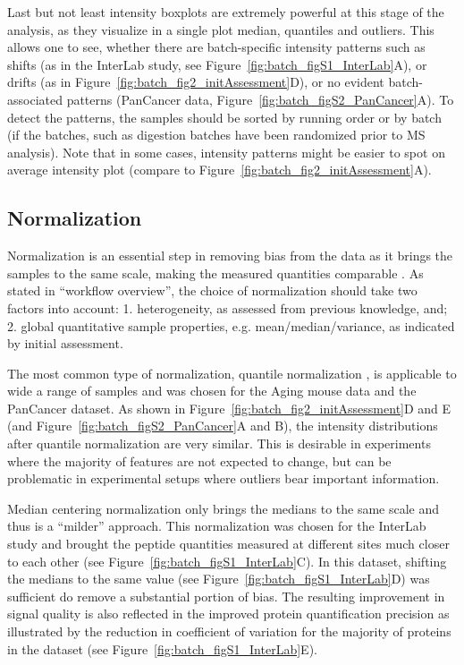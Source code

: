 \documentclass[num-refs]{wiley-article}
\begin{document}
Last but not least intensity boxplots are extremely powerful at this stage of the analysis, as they visualize in a single plot median, quantiles and outliers. This allows one to see, whether there are batch-specific intensity patterns such as shifts (as in the InterLab study, see Figure~\ref{fig:batch_figS1_InterLab}A), or drifts (as in Figure~\ref{fig:batch_fig2_initAssessment}D), or no evident batch-associated patterns (PanCancer data, Figure~\ref{fig:batch_figS2_PanCancer}A). To detect the patterns, the samples should be sorted by running order or by batch (if the batches, such as digestion batches have been randomized prior to MS analysis). Note that in some cases, intensity patterns might be easier to spot on average intensity plot (compare to Figure~\ref{fig:batch_fig2_initAssessment}A).

\subsection{Normalization}

Normalization is an essential step in removing bias from the data as it brings the samples to the same scale, making the measured quantities comparable \cite{Leek:2010aa}. As stated in “workflow overview”, the choice of normalization should take two factors into account: 1. heterogeneity, as assessed from previous knowledge, and; 2. global quantitative sample properties, e.g. mean/median/variance, as indicated by initial assessment.

The most common type of normalization, quantile normalization \cite{Bolstad2003}, is applicable to wide a range of samples and was chosen for the Aging mouse data and the PanCancer dataset. As shown in Figure~\ref{fig:batch_fig2_initAssessment}D and E (and Figure~\ref{fig:batch_figS2_PanCancer}A and B), the intensity distributions after quantile normalization are very similar.  This is desirable in experiments where the majority of features are not expected to change, but can be problematic in experimental setups where outliers bear important information.

Median centering normalization only brings the medians to the same scale and thus is a “milder” approach. This normalization was chosen for the InterLab study and brought the peptide quantities measured at different sites much closer to each other (see Figure~\ref{fig:batch_figS1_InterLab}C). In this dataset, shifting the medians to the same value (see Figure~\ref{fig:batch_figS1_InterLab}D) was sufficient do remove a substantial portion of bias. The resulting improvement in signal quality is also reflected in the improved protein quantification precision as illustrated by the reduction in  coefficient of variation for the majority of proteins in the dataset (see Figure~\ref{fig:batch_figS1_InterLab}E).
\end{document}
